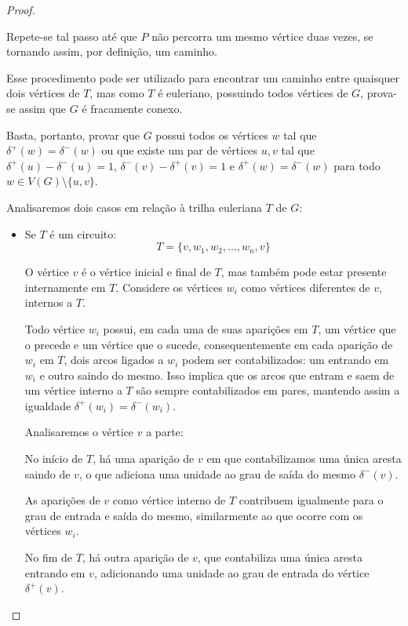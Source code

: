 \documentclass[12pt, a4paper]{article}
\begin{document}
\begin{proof}
\begin{tcolorbox}
            Repete-se tal passo até que $P$ não percorra um mesmo vértice duas vezes, se tornando assim, por definição, um caminho.

        \end{tcolorbox}
    
    Esse procedimento pode ser utilizado para encontrar um caminho entre quaisquer dois vértices de $T$, mas como $T$ é euleriano, possuindo todos vértices de $G$, prova-se assim que $G$ é fracamente conexo. 

     Basta, portanto, provar que $G$ possui todos os vértices $w$ tal que $\delta^+(w) = \delta^-(w)$ ou que existe um par de vértices $u, v$ tal que $\delta^+(u) - \delta^-(u) = 1$, $\delta^-(v) - \delta^+(v) = 1$ e $\delta^+(w) = \delta^-(w)$ para todo $w \in V(G)\setminus \{u, v\}$.

    Analisaremos dois casos em relação à trilha euleriana $T$ de $G$:

    \begin{itemize}
        \item Se $T$ é um circuito:
            \[
                T  = \{v, w_1, w_2, \dots, w_n, v\}
            \]

            O vértice $v$ é o vértice inicial e final de $T$, mas também pode estar presente internamente em $T$. 
            Considere os vértices $w_i$ como vértices diferentes de $v$, internos a $T$.

            Todo vértice $w_i$ possui, em cada uma de suas aparições em $T$, um vértice que o precede e um vértice que o sucede, consequentemente em cada aparição de $w_i$ em $T$, dois arcos ligados a $w_i$ podem ser contabilizados: um entrando em $w_i$ e outro saindo do mesmo. 
            Isso implica que os arcos que entram e saem de um vértice interno a $T$ são sempre contabilizados em pares, mantendo assim a igualdade $\delta^+(w_i) = \delta^-(w_i)$.

            Analisaremos o vértice $v$ a parte:

            No início de $T$, há uma aparição de $v$ em que contabilizamos uma única aresta saindo de $v$, o que adiciona uma unidade ao grau de saída do mesmo $\delta^-(v)$.

            As aparições de $v$ como vértice interno de $T$ contribuem igualmente para o grau de entrada e saída do mesmo, similarmente ao que ocorre com os vértices $w_i$.

            No fim de $T$, há outra aparição de $v$, que contabiliza uma única aresta entrando em $v$, adicionando uma unidade ao grau de entrada do vértice $\delta^+(v)$.


\end{itemize}
\end{proof}
\end{document}
